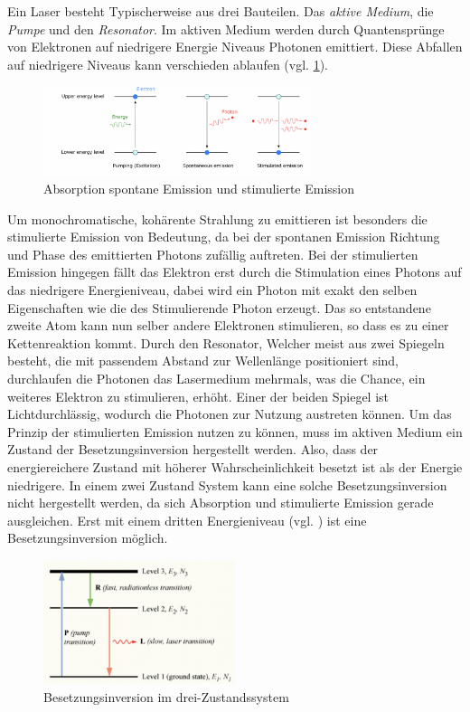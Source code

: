 Ein Laser besteht Typischerweise aus drei Bauteilen. Das \textit{aktive Medium}, die \textit{Pumpe} und den \textit{Resonator}.
Im aktiven Medium werden durch Quantensprünge von Elektronen auf niedrigere Energie Niveaus Photonen emittiert.
Diese Abfallen auf niedrigere Niveaus kann verschieden ablaufen (vgl. \ref{fig:emmision}).
\begin{figure}[h]
    \centering
    \includegraphics[width=0.7\textwidth]{abb/emission.png}
    \caption{Absorption spontane Emission und stimulierte Emission \cite{emission}}
    \label{fig:emmision}
\end{figure}
Um monochromatische, kohärente Strahlung zu emittieren ist besonders die stimulierte Emission von Bedeutung,
da bei der spontanen Emission Richtung und Phase des emittierten Photons zufällig auftreten.
Bei der stimulierten Emission hingegen fällt das Elektron erst durch die Stimulation eines Photons auf das niedrigere Energieniveau,
dabei wird ein Photon mit exakt den selben Eigenschaften wie die des Stimulierende Photon erzeugt.
Das so entstandene zweite Atom kann nun selber andere Elektronen stimulieren,
so dass es zu einer Kettenreaktion kommt. 
Durch den Resonator, 
Welcher meist aus zwei Spiegeln besteht,
die mit passendem Abstand zur Wellenlänge positioniert sind,
durchlaufen die Photonen das Lasermedium mehrmals,
was die Chance, ein weiteres Elektron zu stimulieren, erhöht. 
Einer der beiden Spiegel ist Lichtdurchlässig, wodurch die Photonen zur Nutzung austreten können.
Um das Prinzip der stimulierten Emission nutzen zu können,
muss im aktiven Medium ein Zustand der Besetzungsinversion hergestellt werden.
Also, 
dass der energiereichere Zustand mit höherer Wahrscheinlichkeit besetzt ist als der Energie niedrigere.
In einem zwei Zustand System kann eine solche Besetzungsinversion nicht hergestellt werden,
da sich Absorption und stimulierte Emission gerade ausgleichen.  
Erst mit einem dritten Energieniveau (vgl. ) ist eine Besetzungsinversion möglich.
\begin{figure}[h]
    \centering
    \includegraphics[width=0.5\textwidth]{abb/dreiniveau.png}
    \caption{Besetzungsinversion im drei-Zustandssystem \cite{enwiki}}
    \label{fig:dreiniveau}
\end{figure}
